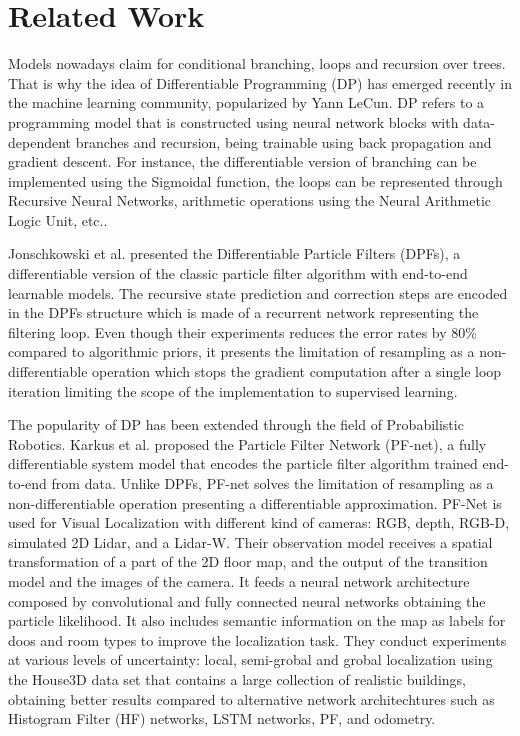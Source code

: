 \section{Related Work}

Models nowadays claim for conditional branching, loops and recursion over trees\cite{inproceedings:ML-ProgrammingLang}. That is why the idea of Differentiable Programming (DP) has emerged recently in the machine learning community, popularized by Yann LeCun\cite{LeCunn:2018}. DP refers to a programming model that is constructed using neural network blocks with data-dependent branches and recursion, being trainable using back propagation and gradient descent\cite{NIPS2018_8221}. For instance, the differentiable version of branching can be implemented using the Sigmoidal function, the loops can be represented through Recursive Neural Networks, arithmetic operations using the Neural Arithmetic Logic Unit, etc.\cite{Scardapane:2019}. 

Jonschkowski et al.\cite{DBLP:journals/corr/abs-1805-11122} presented the Differentiable Particle Filters (DPFs), a differentiable version of the classic particle filter algorithm with end-to-end learnable models. The recursive state prediction and correction steps are encoded in the DPFs structure which is made of a recurrent network representing the filtering loop. Even though their experiments reduces the error rates by 80\% compared to algorithmic priors, it presents the limitation of resampling as a non-differentiable operation which stops the gradient computation after a single loop iteration limiting the scope of the implementation to supervised learning.

The popularity of DP has been extended through the field of Probabilistic Robotics. Karkus et al.\cite{karkus2018particle} proposed the Particle Filter Network (PF-net), a fully differentiable system model that encodes the particle filter algorithm trained end-to-end from data. Unlike DPFs, PF-net  solves the limitation of resampling as a non-differentiable operation presenting a differentiable approximation. PF-Net is used for Visual Localization with different kind of cameras: RGB, depth, RGB-D, simulated 2D Lidar, and a Lidar-W. Their observation model receives a spatial transformation of a part of the 2D floor map, and the output of the transition model and the images of the camera. It feeds a neural network architecture composed by convolutional and fully connected neural networks obtaining the particle likelihood. It also includes semantic information on the map as labels for doos and room types to improve the localization task. They conduct experiments at various levels of uncertainty: local, semi-grobal and grobal localization using the House3D data set\cite{YiHouse3D} that contains a large collection of realistic buildings, obtaining better results compared to alternative network architechtures such as Histogram Filter (HF) networks\cite{Jonschkowski2017EndtoEndLH}, LSTM networks\cite{HochreiterLSTM}, PF, and odometry.

